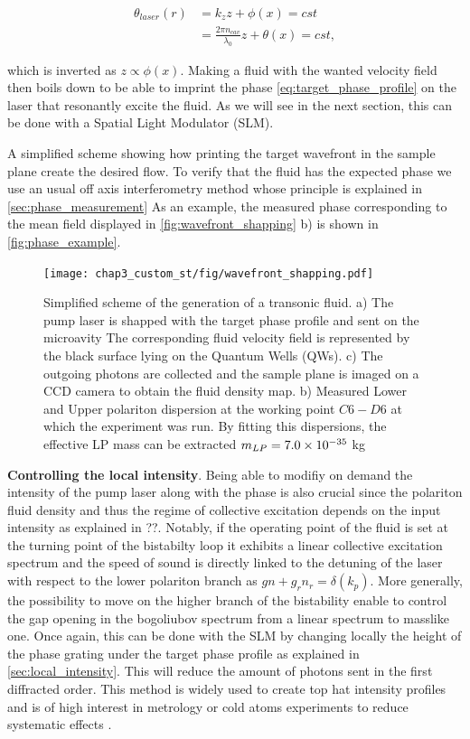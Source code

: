 \begin{equation}
    \begin{align}
    \theta_{laser}(r)&=k_zz+\phi(x)=cst \\
                      &=\frac{2\pi n_{cav} }{\lambda_0}z+\theta(x)= cst,
    \end{align}
\end{equation}

which is inverted as $z\propto \phi(x)$. Making a fluid with the wanted velocity field then boils down to be able to imprint the phase \autoref{eq:target_phase_profile} on the laser that resonantly excite the fluid. As we will see in the next section, this can be done with a Spatial Light Modulator (SLM). 

 A simplified scheme showing how printing the target wavefront in the sample plane create the desired flow.
To verify that the fluid has the expected phase we use an usual off axis interferometry method whose principle is explained in \autoref{sec:phase_measurement}
As an example, the measured phase corresponding to the mean field displayed in \autoref{fig:wavefront_shapping} b) is shown in \autoref{fig:phase_example}.
 
\begin{figure}
    \centering
    \texttt{[image: chap3\_custom\_st/fig/wavefront\_shapping.pdf]}
    \caption{Simplified scheme of the generation of a transonic fluid. a) The pump laser is shapped with the target phase profile and sent on the microavity The corresponding fluid velocity field is represented by the black surface lying on the Quantum Wells (QWs). c) The outgoing photons are collected and the sample 
    plane is imaged on a CCD camera to obtain the fluid density map.  b) Measured Lower and Upper polariton dispersion at the working point $C6-D6$ at which the experiment was run. By fitting this dispersions,
    the effective LP mass can be extracted $m_{LP}= 7.0 \times 10^{-35}$ kg}
    \label{fig:wavefront_shapping}
\end{figure}


\bigskip 

\textbf{Controlling the local intensity}. Being able to modifiy on demand the intensity of the pump laser along with the phase is also crucial since the polariton fluid density and thus the regime of collective excitation 
depends on the input intensity as explained in ??. Notably, if the operating point of the fluid is set at the turning point of the bistabilty loop it exhibits a linear collective excitation spectrum and the speed of sound is directly 
linked to the detuning of the laser with respect to the lower polariton branch as $gn+g_rn_r=\delta(k_p)$. More generally, the possibility to move on the higher branch of the bistability enable to control the gap opening in the bogoliubov spectrum from a linear spectrum to masslike one. 
Once again, this can be done with the SLM by changing locally the height of the phase grating under the target phase profile as explained in \autoref{sec:local_intensity}. This will reduce the amount of photons sent in the first diffracted order. This method is widely used to
create top hat intensity profiles and is of high interest in metrology or cold atoms experiments to reduce systematic effects \cite{top_metrology_2018}.

